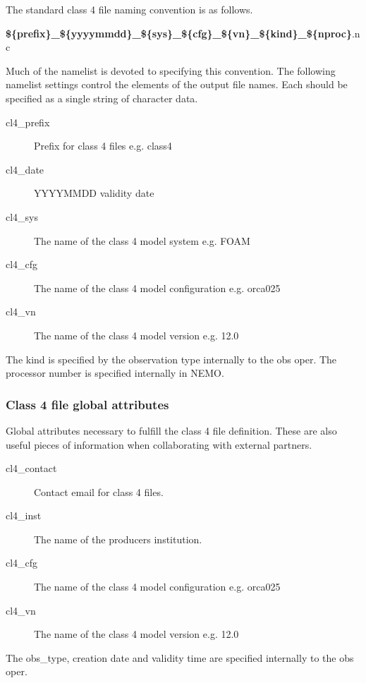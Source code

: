 \documentclass[../tex_main/NEMO_manual]{subfiles}
\begin{document}
The standard class 4 file naming convention is as follows.

\noindent
\linebreak
\textbf{\$\{prefix\}\_\$\{yyyymmdd\}\_\$\{sys\}\_\$\{cfg\}\_\$\{vn\}\_\$\{kind\}\_\$\{nproc\}}.nc

\noindent
\linebreak
Much of the namelist is devoted to specifying this convention.
The following namelist settings control the elements of the output file names.
Each should be specified as a single string of character data.

\begin{description}
\item[cl4\_prefix]
  Prefix for class 4 files e.g. class4
\item[cl4\_date]
  YYYYMMDD validity date
\item[cl4\_sys]
  The name of the class 4 model system e.g. FOAM
\item[cl4\_cfg]
  The name of the class 4 model configuration e.g. orca025
\item[cl4\_vn]
  The name of the class 4 model version e.g. 12.0
\end{description}

\noindent
The kind is specified by the observation type internally to the obs oper.
The processor number is specified internally in NEMO. 

\subsubsection{Class 4 file global attributes}

Global attributes necessary to fulfill the class 4 file definition.
These are also useful pieces of information when collaborating with external partners.

\begin{description}
\item[cl4\_contact]
  Contact email for class 4 files.
\item[cl4\_inst]
  The name of the producers institution.
\item[cl4\_cfg]
  The name of the class 4 model configuration e.g. orca025
\item[cl4\_vn]
  The name of the class 4 model version e.g. 12.0
\end{description}

\noindent
The obs\_type, creation date and validity time are specified internally to the obs oper.
\end{document}
